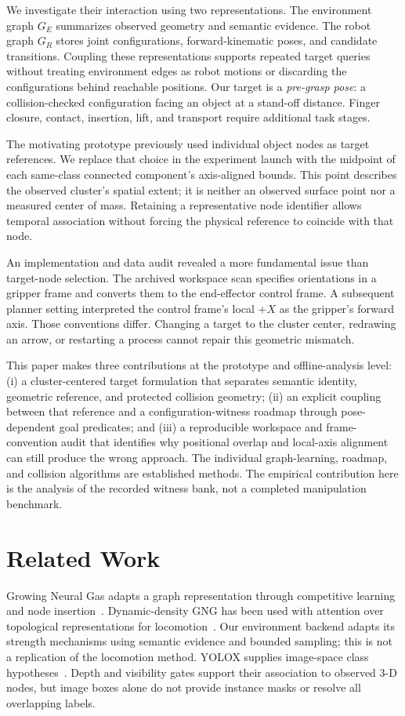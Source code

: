 \documentclass[letterpaper,10pt,conference]{ieeeconf}
\begin{document}
We investigate their interaction using two representations. The environment graph $G_E$ summarizes observed geometry and semantic evidence. The robot graph $G_R$ stores joint configurations, forward-kinematic poses, and candidate transitions. Coupling these representations supports repeated target queries without treating environment edges as robot motions or discarding the configurations behind reachable positions. Our target is a \emph{pre-grasp pose}: a collision-checked configuration facing an object at a stand-off distance. Finger closure, contact, insertion, lift, and transport require additional task stages.

The motivating prototype previously used individual object nodes as target references. We replace that choice in the experiment launch with the midpoint of each same-class connected component's axis-aligned bounds. This point describes the observed cluster's spatial extent; it is neither an observed surface point nor a measured center of mass. Retaining a representative node identifier allows temporal association without forcing the physical reference to coincide with that node.

An implementation and data audit revealed a more fundamental issue than target-node selection. The archived workspace scan specifies orientations in a gripper frame and converts them to the end-effector control frame. A subsequent planner setting interpreted the control frame's local $+X$ as the gripper's forward axis. Those conventions differ. Changing a target to the cluster center, redrawing an arrow, or restarting a process cannot repair this geometric mismatch.

This paper makes three contributions at the prototype and offline-analysis level: (i) a cluster-centered target formulation that separates semantic identity, geometric reference, and protected collision geometry; (ii) an explicit coupling between that reference and a configuration-witness roadmap through pose-dependent goal predicates; and (iii) a reproducible workspace and frame-convention audit that identifies why positional overlap and local-axis alignment can still produce the wrong approach. The individual graph-learning, roadmap, and collision algorithms are established methods. The empirical contribution here is the analysis of the recorded witness bank, not a completed manipulation benchmark.

\section{Related Work}
Growing Neural Gas adapts a graph representation through competitive learning and node insertion~\cite{fritzke1995gng}. Dynamic-density GNG has been used with attention over topological representations for locomotion~\cite{saputra2023ddgng}. Our environment backend adapts its strength mechanisms using semantic evidence and bounded sampling; this is not a replication of the locomotion method. YOLOX supplies image-space class hypotheses~\cite{ge2021yolox}. Depth and visibility gates support their association to observed 3-D nodes, but image boxes alone do not provide instance masks or resolve all overlapping labels.
\end{document}
